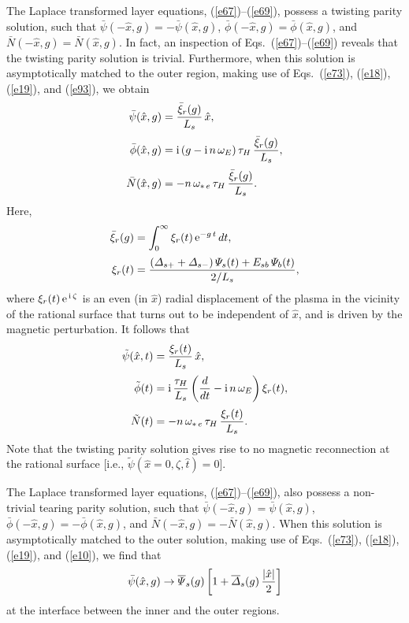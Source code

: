 \documentclass[12pt,prb,aps]{revtex4-1}
\begin{document}
The Laplace transformed layer equations, (\ref{e67})--(\ref{e69}), possess a twisting parity solution,\cite{twist} such that 
$\bar{\psi}(-\hat{x},g)=-\bar{\psi}(\hat{x},g)$, $\bar{\phi}(-\hat{x},g)=\bar{\phi}(\hat{x},g)$, and $\bar{N}(-\hat{x},g)=
\bar{N}(\hat{x},g)$. In fact, an inspection of Eqs.~(\ref{e67})--(\ref{e69}) reveals that the twisting parity solution is
trivial. Furthermore, when this solution is asymptotically matched to the outer region, making use of Eqs.~(\ref{e73}), (\ref{e18}), (\ref{e19}),  and (\ref{e93}), we obtain
\begin{align}
\bar{\psi}(\hat{x},g)&= \frac{\bar{\xi}_r(g)}{L_s}\,\hat{x},\\[0.5ex]
\bar{\phi}(\hat{x},g)&={\rm i}\,(g-{\rm i}\,n\,\omega_E)\,\tau_H\,\frac{\bar{\xi}_r(g)}{L_s},\\[0.5ex]
\bar{N}(\hat{x},g) &= -n\,\omega_{\ast\,e}\,\tau_{H}\,\frac{\bar{\xi}_r(g)}{L_s}.
\end{align}
Here, 
\begin{align}
\bar{\xi}_r(g)& = \int_0^\infty \xi_r(t)\,{\rm e}^{-g\,t}\,dt,\\[0.5ex]
\xi_r(t)&= \frac{({\mit\Delta}_{s+}+{\mit\Delta}_{s-})\,{\mit\Psi}_s(t)+E_{sb}\,{\mit\Psi}_b(t)}{2/L_s}, 
\end{align}
where $\xi_r(t)\,{\rm e}^{\,{\rm i}\,\zeta}$ is an even (in $\hat{x}$) radial displacement of the plasma in the vicinity of the rational
surface that turns out to be independent of $\hat{x}$, and is driven by the magnetic perturbation. It follows that\,\cite{ed}
\begin{align}
\tilde{\psi}(\hat{x},t) &=  \frac{\xi_r(t)}{L_s}\,\hat{x},\\[0.5ex]
\tilde{\phi}(t) &={\rm i}\,\frac{\tau_H}{L_s}\left(\frac{d}{dt} - {\rm i}\,n\,\omega_E\right)\xi_r(t),\\[0.5ex]
\tilde{N}(t) &= -n\,\omega_{\ast\,e}\,\tau_H\,\frac{\xi_r(t)}{L_s}.
\end{align}
Note that the twisting parity solution gives rise to no magnetic reconnection at the rational surface [i.e., $\tilde{\psi}(\hat{x}=0,\zeta,\hat{t})=0$].

The Laplace transformed layer equations, (\ref{e67})--(\ref{e69}), also possess a non-trivial tearing parity solution,\cite{twist} such that 
$\bar{\psi}(-\hat{x},g)=\bar{\psi}(\hat{x},g)$, $\bar{\phi}(-\hat{x},g)=-\bar{\phi}(\hat{x},g)$, and $\bar{N}(-\hat{x},g)=
-\bar{N}(\hat{x},g)$. When this solution is asymptotically matched to the outer solution, making use of Eqs.~(\ref{e73}), (\ref{e18}), (\ref{e19}),  and (\ref{e10}), we find that
\begin{equation}\label{e79}
\bar{\psi}(\hat{x},g)\rightarrow \overline{\mit\Psi}_s(g)\left[1+\overline{\mit\Delta}_s(g)\,\frac{|\hat{x}|}{2}\right]
\end{equation}
at the interface between the inner and the outer regions. 
\end{document}
